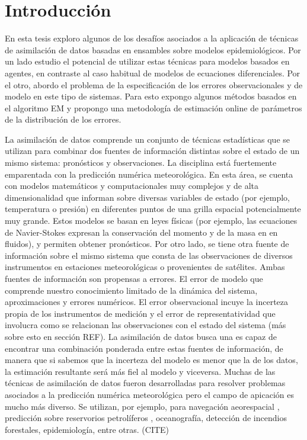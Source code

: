 \chapter{Introducción}

En esta tesis exploro algunos de los desafíos asociados a la aplicación de técnicas de asimilación de datos basadas en ensambles sobre modelos epidemiológicos. Por un lado estudio el potencial de utilizar estas técnicas para modelos basados en agentes, en contraste al caso habitual de modelos de ecuaciones diferenciales. Por el otro, abordo el problema de la especificación de los errores observacionales y de modelo en este tipo de sistemas. Para esto expongo algunos métodos basados en el algoritmo EM y propongo una metodología de estimación online de parámetros de la distribución de los errores.

La asimilación de datos comprende un conjunto de técnicas estadísticas que se utilizan para combinar dos fuentes de información distintas sobre el estado de un mismo sistema: pronósticos y observaciones. La disciplina está fuertemente emparentada con la predicción numérica meteorológica. En esta área, se cuenta con modelos matemáticos y computacionales muy complejos y de alta dimensionalidad que informan sobre diversas variables de estado (por ejemplo, temperatura o presión) en diferentes puntos de una grilla espacial potencialmente muy grande. Estos modelos se basan en leyes físicas (por ejemplo, las ecuaciones de Navier-Stokes expresan la conservación del momento y de la masa en en fluidos), y permiten obtener pronósticos. Por otro lado, se tiene otra fuente de información sobre el mismo sistema que consta de las observaciones de diversos instrumentos en estaciones meteorológicas o provenientes de satélites. Ambas fuentes de información son propensas a errores. El error de modelo que comprende nuestro conocimiento limitado de la dinámica del sistema, aproximaciones y errores numéricos. El error observacional incuye la incerteza propia de los instrumentos de medición y el error de representatividad que involucra como se relacionan las observaciones con el estado del sistema (más sobre esto en sección REF). La asimilación de datos busca una es capaz de encontrar una combinación ponderada entre estas fuentes de información, de manera que si sabemos que la incerteza del modelo es menor que la de los datos, la estimación resultante será más fiel al modelo y viceversa. Muchas de las técnicas de asimilación de datos fueron desarrolladas para resolver problemas asociados a la predicción numérica meteorológica pero el campo de apicación es mucho más diverso. Se utilizan, por ejemplo, para navegación aeorespacial \cite{Grewal2010}, predicción sobre reservorios petrolíferos \cite{Aanonsen2009}, oceanografía, detección de incendios forestales, epidemiología, entre otras. (CITE)


